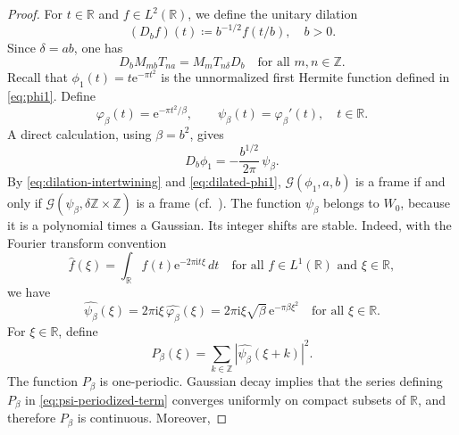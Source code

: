 \documentclass[11pt]{amsart}
\numberwithin{equation}{section}
\theoremstyle{definition}
\theoremstyle{remark}
\newcommand{\R}{\mathbb R}
\newcommand{\Z}{\mathbb Z}
\newcommand{\ii}{\mathrm i}
\newcommand{\e}{\mathrm e}
\newcommand{\cG}{\mathcal G}
\begin{document}
    \begin{proof}
        For $t \in \R$ and $f \in L^2(\R)$, we define the unitary dilation
        \begin{equation}
            (D_bf)(t)\coloneqq b^{-1/2}f(t/b), \quad b > 0.
        \end{equation}
        Since $\delta=ab$, one has
        \begin{equation}\label{eq:dilation-intertwining}
            D_bM_{mb}T_{na}=M_mT_{n\delta}D_b
            \quad\text{for all }m,n\in\Z.
        \end{equation}
        Recall that $\phi_1(t) = t \e^{-\pi t^2}$ is the unnormalized first Hermite function defined in \eqref{eq:phi1}. Define
        \begin{equation}
            \varphi_\beta(t)=\e^{-\pi t^2/\beta},
            \qquad
            \psi_\beta(t)=\varphi_\beta'(t),
            \quad t \in \R.
        \end{equation}
        A direct calculation, using $\beta=b^2$, gives
        \begin{equation}\label{eq:dilated-phi1}
            D_b\phi_1=-\frac{b^{1/2}}{2\pi}\,\psi_\beta.
        \end{equation}
        By \eqref{eq:dilation-intertwining} and \eqref{eq:dilated-phi1}, $\cG(\phi_1,a,b)$ is a frame if and only if $\cG(\psi_\beta,\delta\Z\times\Z)$ is a frame (cf.~\cite[Chap.~9.4]{GroechenigBook}). The function $\psi_\beta$ belongs to $W_0$, because it is a polynomial times a Gaussian. Its integer shifts are stable. Indeed, with the Fourier transform convention
        \begin{equation}\label{eq:Fourier-convention}
            \widehat f(\xi)=\int_\R f(t)\e^{-2\pi\ii t\xi}\,dt
            \quad\text{for all }f\in L^1(\R)\text{ and }\xi\in\R,
        \end{equation}
        we have
        \begin{equation}\label{eq:psi-Fourier}
            \widehat{\psi_\beta}(\xi)
            =2\pi\ii\xi\,\widehat{\varphi_\beta}(\xi)
            =2\pi\ii\xi\sqrt\beta\,\e^{-\pi\beta\xi^2}
            \quad\text{for all }\xi\in\R.
        \end{equation}
        For $\xi\in\R$, define
        \begin{equation}\label{eq:psi-periodized-term}
            P_\beta(\xi)=\sum_{k\in\Z}|\widehat{\psi_\beta}(\xi+k)|^2.
        \end{equation}
        The function $P_\beta$ is one-periodic. Gaussian decay implies that the series defining $P_\beta$ in \eqref{eq:psi-periodized-term} converges uniformly on compact subsets of $\R$, and therefore $P_\beta$ is continuous. Moreover,

\end{proof}
\end{document}
